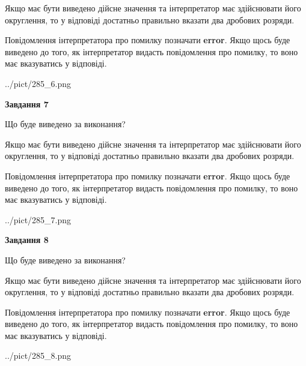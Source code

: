 \documentclass[12pt, ukrainian]{article}
\begin{document}
{\begin {Large}
Якщо має бути виведено дійсне значення та інтерпретатор має здійснювати його округлення, 
то у відповіді достатньо правильно вказати два дробових розряди.

Повідомлення інтерпретатора про помилку позначати \textbf{error}.
Якщо щось буде виведено до того, як інтерпретатор видасть повідомлення про помилку, 
то воно має вказуватись у відповіді. \par

\begin{center}
	{../pict/285_6.png}
\end{center}
\newpage

{\begin {center}\textbf{Завдання 7}\end {center}}\par
Що буде виведено за виконання? \par

Якщо має бути виведено дійсне значення та інтерпретатор має здійснювати його округлення, 
то у відповіді достатньо правильно вказати два дробових розряди.

Повідомлення інтерпретатора про помилку позначати \textbf{error}.
Якщо щось буде виведено до того, як інтерпретатор видасть повідомлення про помилку, 
то воно має вказуватись у відповіді. \par

\begin{center}
	{../pict/285_7.png}
\end{center}
\newpage

{\begin {center}\textbf{Завдання 8}\end {center}}\par
Що буде виведено за виконання? \par

Якщо має бути виведено дійсне значення та інтерпретатор має здійснювати його округлення, 
то у відповіді достатньо правильно вказати два дробових розряди.

Повідомлення інтерпретатора про помилку позначати \textbf{error}.
Якщо щось буде виведено до того, як інтерпретатор видасть повідомлення про помилку, 
то воно має вказуватись у відповіді. \par

\begin{center}
	{../pict/285_8.png}
\end{center}
\newpage


\end{Large}}
\end{document}

